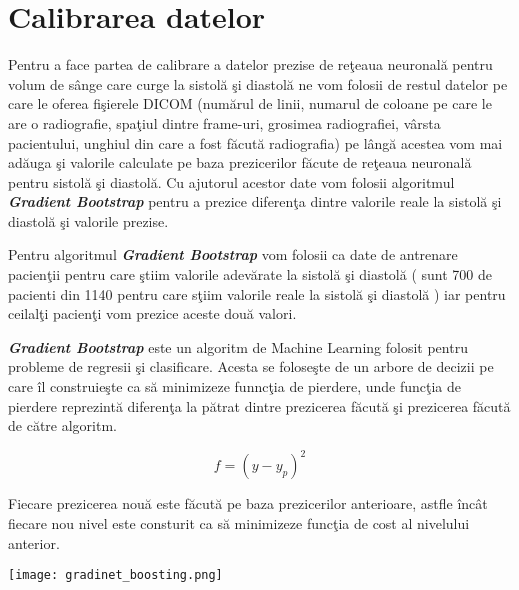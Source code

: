 \section{Calibrarea datelor}

Pentru a face partea de calibrare a datelor prezise de re\c{t}eaua neuronal\u{a} pentru volum de s\^{a}nge care curge la sistol\u{a} \c{s}i diastol\u{a} ne vom folosii de restul datelor pe care le oferea fi\c{s}ierele DICOM (num\u{a}rul de linii, numarul de coloane pe care le are o radiografie, spa\c{t}iul dintre frame-uri, grosimea radiografiei, v\^{a}rsta pacientului, unghiul din care a fost f\u{a}cut\u{a} radiografia) pe l\^{a}ng\u{a} acestea vom mai ad\u{a}uga \c{s}i valorile calculate pe baza prezicerilor f\u{a}cute de re\c{t}eaua neuronal\u{a} pentru sistol\u{a} \c{s}i diastol\u{a}. Cu ajutorul acestor date vom folosii algoritmul \textbf{\textit{Gradient Bootstrap}} pentru a prezice diferen\c{t}a dintre valorile reale la sistol\u{a} \c{s}i diastol\u{a} \c{s}i valorile prezise.

\par

Pentru algoritmul \textbf{\textit{Gradient Bootstrap}} vom folosii ca date de antrenare pacien\c{t}ii pentru care \c{s}tiim valorile adev\u{a}rate la sistol\u{a} \c{s}i diastol\u{a} ( sunt 700 de pacienti din 1140 pentru care s\c{t}iim valorile reale la sistol\u{a} \c{s}i diastol\u{a} ) iar pentru ceilal\c{t}i pacien\c{t}i vom prezice aceste dou\u{a} valori.

\par

\textbf{\textit{Gradient Bootstrap}} este un algoritm de Machine Learning folosit pentru probleme de regresii \c{s}i clasificare. Acesta se folose\c{s}te de un arbore de decizii pe care \^{i}l construie\c{s}te ca s\u{a} minimizeze funnc\c{t}ia de pierdere, unde func\c{t}ia de pierdere reprezint\u{a} diferen\c{t}a la p\u{a}trat dintre prezicerea f\u{a}cut\u{a} \c{s}i prezicerea f\u{a}cut\u{a} de c\u{a}tre algoritm.

$$ f = (y - y_p )^2 $$

Fiecare prezicerea nou\u{a} este f\u{a}cut\u{a} pe baza prezicerilor anterioare, astfle \^{i}nc\^{a}t fiecare nou nivel este consturit ca s\u{a} minimizeze func\c{t}ia de cost al nivelului anterior.

\begin{center}
\texttt{[image: gradinet\_boosting.png]}
\end{center} 

